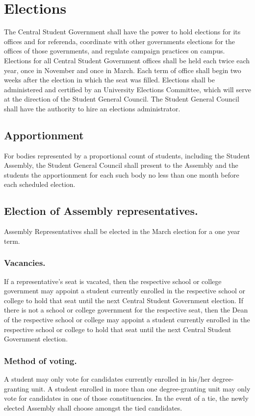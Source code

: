 \section{Elections}
    The Central Student Government shall have the power to hold elections for its offices and for referenda, coordinate with other governments elections for the offices of those governments, and regulate campaign practices on campus. Elections for all Central Student Government offices shall be held each twice each year, once in November and once in March. Each term of office shall begin two weeks after the election in which the seat was filled. Elections shall be administered and certified by an University Elections Committee, which will serve at the direction of the Student General Council. The Student General Council shall have the authority to hire an elections administrator.

\subsection{Apportionment}
For bodies represented by a proportional count of students, including the Student Assembly, the Student General Council shall present to the Assembly and the students the apportionment for each such body no less than one month before each scheduled election.

\subsection{Election of Assembly representatives.}  Assembly Representatives shall be elected in the March election for a one year term.

\subsubsection{Vacancies.}  If a representative's seat is vacated, then the respective school or college government may appoint a student currently enrolled in the respective school or college to hold that seat until the next Central Student Government election.  If there is not a school or college government for the respective seat, then the Dean of the respective school or college may appoint a student currently enrolled in the respective school or college to hold that seat until the next Central Student Government election.
\subsubsection{Method of voting.}  A student may only vote for candidates currently enrolled in his/her degree-granting unit.  A student enrolled in more than one degree-granting unit may only vote for candidates in one of those constituencies.    In the event of a tie, the newly elected Assembly shall choose amongst the tied candidates.

